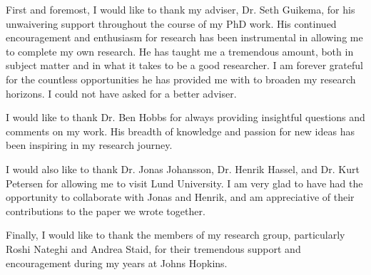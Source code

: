 \begin{frontmatter}
\begin{acknowledgment}\label{sec:acknowledgments}

First and foremost, I would like to thank my adviser, Dr. Seth Guikema, for his unwaivering support throughout the course of my PhD work.  His continued encouragement and enthusiasm for research has been instrumental in allowing me to complete my own research.  He has taught me a tremendous amount, both in subject matter and in what it takes to be a good researcher. I am forever grateful for the countless opportunities he has provided me with to broaden my research horizons. I could not have asked for a better adviser.

I would like to thank Dr. Ben Hobbs for always providing insightful questions and comments on my work. His breadth of knowledge and passion for new ideas has been inspiring in my research journey.

I would also like to thank Dr. Jonas Johansson, Dr. Henrik Hassel, and Dr. Kurt Petersen for allowing me to visit Lund University.  I am very glad to have had the opportunity to collaborate with Jonas and Henrik, and am appreciative of their contributions to the paper we wrote together.

Finally, I would like to thank the members of my research group, particularly Roshi Nateghi and Andrea Staid, for their tremendous support and encouragement during my years at Johns Hopkins.

\end{acknowledgment}




\tableofcontents

\listoftables

\listoffigures


\end{frontmatter}

